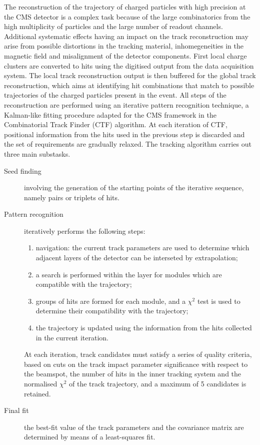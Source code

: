 The reconstruction of the trajectory of charged particles with high precision at the CMS detector
is a complex task because of the large combinatorics from the high multiplicity of particles and the large number of readout channels.
Additional systematic effects having an impact on the track reconstruction may arise from possible distortions in the tracking
material, inhomegeneities in the magnetic field and misalignment of the detector components.
First local charge clusters are converted to hits using the digitised output from the data acquisition system.
The local track reconstruction output is then buffered for the global track reconstruction, which aims at identifying
hit combinations that match to possible trajectories of the charged particles present in the event.
All steps of the reconstruction are performed using an iterative pattern recognition technique, a Kalman-like fitting procedure adapted for the CMS framework in the Combinatorial Track Finder \cite{billoir.qian:simultaneous} (CTF) algorithm.
At each iteration of CTF, positional information from the hits used in the previous step is discarded and the set of requirements are gradually relaxed.
The tracking algorithm carries out three main substasks.
\begin{description}
\item[Seed finding] involving the generation of the starting points of the iterative sequence, namely pairs or triplets of hits.
\item[Pattern recognition] iteratively performs the following steps:
  \begin{enumerate}
  \item navigation: the current track parameters are used to determine which adjacent layers of the detector can be interseted by extrapolation;
  \item a search is performed within the layer for modules which are compatible with the trajectory;
  \item groups of hits are formed for each module, and a $\chi^2$ test is used to determine their compatibility with the trajectory;
  \item the trajectory is updated using the information from the hits collected in the current iteration.
  \end{enumerate}
  At each iteration, track candidates must satisfy a series of quality criteria, based on cuts on the track impact parameter significance with respect to the beamspot, the number of hits in the inner tracking system and the normalised $\chi^2$ of the track trajectory, and a maximum of 5 candidates is retained.
\item[Final fit] the best-fit value of the track parameters and the covariance matrix are determined by means of a least-squares fit.
\end{description}

